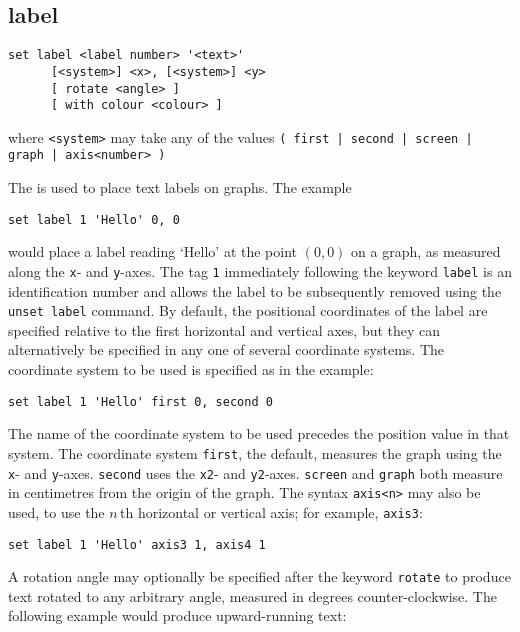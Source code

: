 \subsection{label}

\begin{verbatim}
set label <label number> '<text>'
      [<system>] <x>, [<system>] <y>
      [ rotate <angle> ]
      [ with colour <colour> ]
\end{verbatim}

\noindent where {\tt <system>} may take any of the values
\newline\noindent
{\tt ( first | second | screen | graph | axis<number> )}
\vspace{5mm}

The  is used to place text labels on graphs. The example

\begin{verbatim}
set label 1 'Hello' 0, 0
\end{verbatim}

\noindent would place a label reading `Hello' at the point $(0,0)$ on a graph,
as measured along the {\tt x}- and {\tt y}-axes.  The tag {\tt 1} immediately
following the keyword {\tt label} is an identification number and allows the
label to be subsequently removed using the {\tt unset label} command. By
default, the positional coordinates of the label are specified relative to the
first horizontal and vertical axes, but they can alternatively be specified in
any one of several coordinate systems. The coordinate system to be used is
specified as in the example:

\begin{verbatim}
set label 1 'Hello' first 0, second 0
\end{verbatim}

\noindent The name of the coordinate system to be used precedes the position
value in that system. The coordinate system {\tt first}, the default, measures
the graph using the {\tt x}- and {\tt y}-axes. {\tt second} uses the {\tt x2}-
and {\tt y2}-axes.  {\tt screen} and {\tt graph} both measure in centimetres
from the origin of the graph.  The syntax {\tt axis<n>} may also be used, to
use the $n\,$th horizontal or vertical axis; for example, {\tt axis3}:

\begin{verbatim}
set label 1 'Hello' axis3 1, axis4 1
\end{verbatim}

A rotation angle may optionally be specified after the keyword {\tt rotate}
to produce text rotated to any arbitrary angle, measured in degrees
counter-clockwise. The following example would produce upward-running text:


